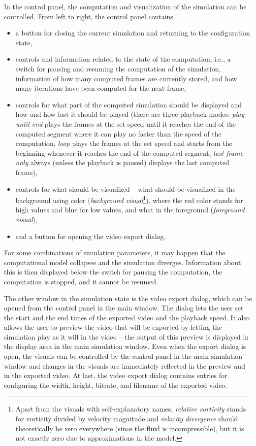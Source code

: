 \documentclass[11pt,a4paper,twoside,openright]{report}
\begin{document}
In the control panel, the computation and visualization of the simulation can be controlled. From left to right, the control panel contains
\begin{itemize}
	\item a button for closing the current simulation and returning to the configuration state,
	\item controls and information related to the state of the computation, i.e., a switch for pausing and resuming the computation of the simulation, information of how many computed frames are currently stored, and how many iterations have been computed for the next frame,
	\item controls for what part of the computed simulation should be displayed and how and how fast it should be played (there are three playback modes: \emph{play until end} plays the frames at the set speed until it reaches the end of the computed segment where it can play no faster than the speed of the computation, \emph{loop} plays the frames at the set speed and starts from the beginning whenever it reaches the end of the computed segment, \emph{last frame only} always (unless the playback is paused) displays the last computed frame),
	\item controls for what should be visualized -- what should be visualized in the background using color (\emph{background visual}\footnote{Apart from the visuals with self-explanatory names, \emph{relative vorticity} stands for vorticity divided by velocity magnitude and \emph{velocity divergence} should theoretically be zero everywhere (since the fluid is incompressible), but it is not exactly zero due to approximations in the model.}), where the red color stands for high values and blue for low values, and what in the foreground (\emph{foreground visual}),
	\item and a button for opening the video export dialog.
\end{itemize}
For some combinations of simulation parameters, it may happen that the computational model collapses and the simulation diverges. Information about this is then displayed below the switch for pausing the computation, the computation is stopped, and it cannot be resumed.

The other window in the simulation state is the video export dialog, which can be opened from the control panel in the main window. The dialog lets the user set the start and the end times of the exported video and the playback speed. It also allows the user to preview the video that will be exported by letting the simulation play as it will in the video -- the output of this preview is displayed in the display area in the main simulation window. Even when the export dialog is open, the visuals can be controlled by the control panel in the main simulation window and changes in the visuals are immediately reflected in the preview and in the exported video. At last, the video export dialog contains entries for configuring the width, height, bitrate, and filename of the exported video.
\end{document}
